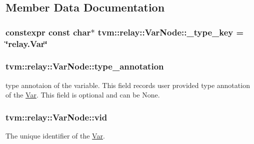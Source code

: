 \subsection{Member Data Documentation}
\subsubsection[{\texorpdfstring{\+\_\+type\+\_\+key}{_type_key}}]{\setlength{\rightskip}{0pt plus 5cm}constexpr const char$\ast$ tvm\+::relay\+::\+Var\+Node\+::\+\_\+type\+\_\+key = \char`\"{}relay.\+Var\char`\"{}\hspace{0.3cm}{\ttfamily [static]}}\hypertarget{classtvm_1_1relay_1_1VarNode_a8f636ca6173977176ebee6fed7820669}{}\label{classtvm_1_1relay_1_1VarNode_a8f636ca6173977176ebee6fed7820669}
\subsubsection[{\texorpdfstring{type\+\_\+annotation}{type_annotation}}]{ tvm\+::relay\+::\+Var\+Node\+::type\+\_\+annotation}\hypertarget{classtvm_1_1relay_1_1VarNode_a79a56885eaf2a9326ff490164a5c1f0e}{}\label{classtvm_1_1relay_1_1VarNode_a79a56885eaf2a9326ff490164a5c1f0e}


type annotaion of the variable. This field records user provided type annotation of the \hyperlink{classtvm_1_1relay_1_1Var}{Var}. This field is optional and can be None. 

\subsubsection[{\texorpdfstring{vid}{vid}}]{ tvm\+::relay\+::\+Var\+Node\+::vid}\hypertarget{classtvm_1_1relay_1_1VarNode_af191a8eedf3575d626771c9c820ddb63}{}\label{classtvm_1_1relay_1_1VarNode_af191a8eedf3575d626771c9c820ddb63}


The unique identifier of the \hyperlink{classtvm_1_1relay_1_1Var}{Var}. 

